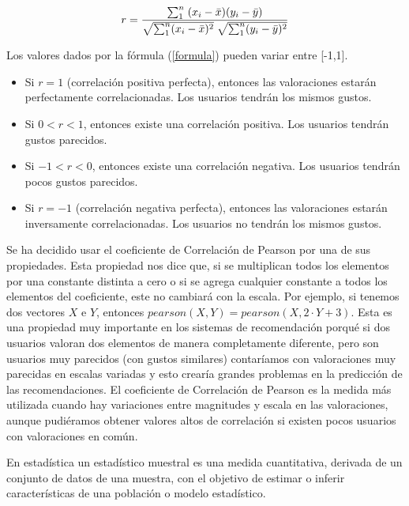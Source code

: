 \documentclass{uimppracticas}
\begin{document}
\begin{equation}\label{formula}
	\large r = \frac{\sum_{1}^{n} \; (x_{i} - \bar{x}) (y_{i} - \bar{y})}{\sqrt{\sum_{1}^{n}(x_{i} - \bar{x})^2} \; \sqrt{\sum_{1}^{n}(y_{i} - \bar{y})^2}}
\end{equation}

Los valores dados por la fórmula (\ref{formula}) pueden variar entre [-1,1].

\begin{itemize}
	\item Si $r=1$ (correlación positiva perfecta), entonces las valoraciones estarán perfectamente correlacionadas. Los usuarios tendrán los mismos gustos.
	\item Si $0<r<1$, entonces existe una correlación positiva. Los usuarios tendrán gustos parecidos.
	\item Si $-1<r<0$, entonces existe una correlación negativa. Los usuarios tendrán pocos gustos parecidos.
	\item Si $r=-1$ (correlación negativa perfecta), entonces las valoraciones estarán inversamente correlacionadas. Los usuarios no tendrán los mismos gustos.
\end{itemize}

Se ha decidido usar el coeficiente de Correlación de Pearson por una de sus propiedades. Esta propiedad nos dice que, si se multiplican todos los elementos por una constante distinta a cero o si se agrega cualquier constante a todos los elementos del coeficiente, este no cambiará con la escala. Por ejemplo, si tenemos dos vectores $X$ e $Y$, entonces $pearson(X,Y) = pearson(X,2\cdot Y+3)$. Esta es una propiedad muy importante en los sistemas de recomendación porqué si dos usuarios valoran dos elementos de manera completamente diferente, pero son usuarios muy parecidos (con gustos similares) contaríamos con valoraciones muy parecidas en escalas variadas y esto crearía grandes problemas en la predicción de las recomendaciones. El coeficiente de Correlación de Pearson es la medida más utilizada cuando hay variaciones entre magnitudes y escala en las valoraciones, aunque pudiéramos obtener valores altos de correlación si existen pocos usuarios con valoraciones en común.

\begin{definition}\label{estadístico_muestral}
En estadística un estadístico muestral es una medida cuantitativa, derivada de un conjunto de datos de una muestra, con el objetivo de estimar o inferir características de una población o modelo estadístico.
\end{definition}
\end{document}
